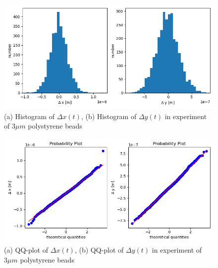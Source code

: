\documentclass{article}
\begin{document}
 \begin{figure}[ht]
    \centering
    \includegraphics[width=0.8\linewidth]{../results/3um_brownian_distribution_fig_0.png}
    \caption{(a) Histogram of $\Delta x(t)$, (b) Histogram of $\Delta y(t)$ in experiment of $3 \mu m$ polystyrene beads}
    \label{Figure:brownian_motion_distribution_fig}
\end{figure}
\begin{figure}[ht]
    \centering
    \includegraphics[width=0.8\linewidth]{../results/3um_brownian_qqplot_fig_0.png}
    \caption{(a) QQ-plot of $\Delta x(t)$, (b) QQ-plot of $\Delta y(t)$ in experiment of $3 \mu m$ polystyrene beads}
    \label{Figure:brownian_qqplot}
\end{figure}
\end{document}
